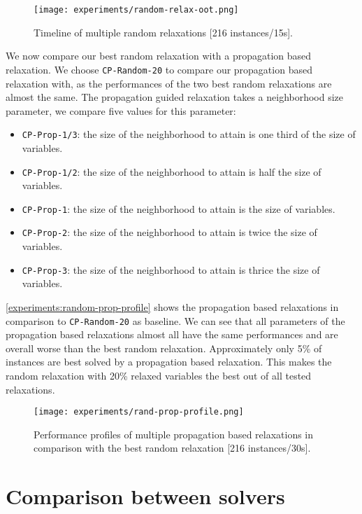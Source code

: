 \documentclass[../../thesis.tex]{subfiles}
\begin{document}
\begin{figure}[H]
  \centering
  \texttt{[image: experiments/random-relax-oot.png]}
  \caption{Timeline of multiple random relaxations [216 instances/15s].}
  \label{experiments:random-relax-oot}
\end{figure}


We now compare our best random relaxation with a propagation based relaxation.
We choose \texttt{CP-Random-20} to compare our propagation based relaxation with, as the performances of 
the two best random relaxations are almost the same.
The propagation guided relaxation takes a neighborhood size parameter, we compare five values for this parameter:

\begin{itemize}
  \item \texttt{CP-Prop-1/3}: the size of the neighborhood to attain is one third of the size of variables.
  \item \texttt{CP-Prop-1/2}: the size of the neighborhood to attain is half the size of variables.
  \item \texttt{CP-Prop-1}: the size of the neighborhood to attain is the size of variables.
  \item \texttt{CP-Prop-2}: the size of the neighborhood to attain is twice the size of variables.
  \item \texttt{CP-Prop-3}: the size of the neighborhood to attain is thrice the size of variables.
\end{itemize}

\autoref{experiments:random-prop-profile} shows the propagation based relaxations in comparison to \texttt{CP-Random-20} as baseline.
We can see that all parameters of the propagation based relaxations almost all have the same performances and 
are overall worse than the best random relaxation. Approximately only 5\% of instances are best solved by a propagation based 
relaxation. This makes the random relaxation with 20\% relaxed variables the best out of all tested relaxations.

\begin{figure}
  \centering
  \texttt{[image: experiments/rand-prop-profile.png]}
  \caption{Performance profiles of multiple propagation based relaxations in comparison with the best random relaxation [216 instances/30s].}
  \label{experiments:random-prop-profile}
\end{figure}


\section{Comparison between solvers}
\end{document}
